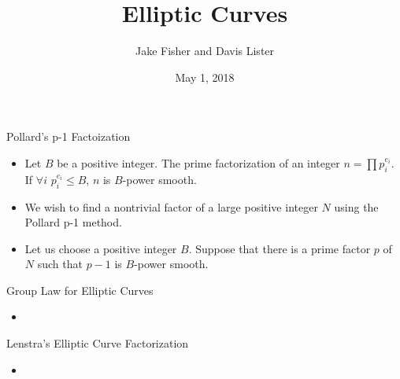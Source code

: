\documentclass{beamer}
\title{Elliptic Curves}
\author{Jake Fisher and Davis Lister}
\date{May 1, 2018}
\begin{document}
	
	\begin{frame}
		\titlepage
	\end{frame}
	\begin{frame}{Pollard's p-1 Factoization}
		\begin{itemize}
			\item Let $B$ be a positive integer. The prime factorization of an integer $n=\prod p_{i}^{e_{i}}$. If $\forall i$ $p_{i}^{e_{i}} \leq B$, $n$ is $B$-power smooth.
			\item We wish to find a nontrivial factor of a large positive integer $N$ using the Pollard p-1 method.
			\item Let us choose a positive integer $B$. Suppose that there is a prime factor $p$ of $N$ such that $p-1$ is $B$-power smooth.
		\end{itemize}
	\end{frame}
	
	\begin{frame}{Group Law for Elliptic Curves}
		\begin{itemize}
			\item
		\end{itemize}
	\end{frame}
	
	\begin{frame}{Lenstra's Elliptic Curve Factorization}
		\begin{itemize}
			\item
		\end{itemize}
	\end{frame}
\end{document}
